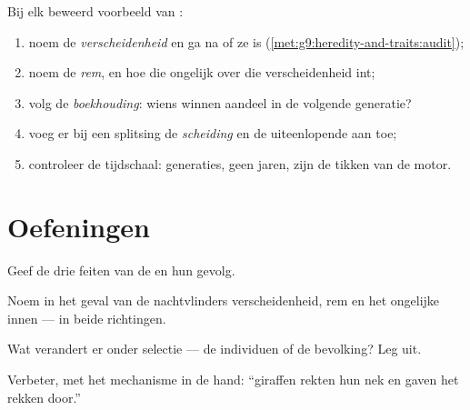 \begin{method}\label{met:g9:how-species-change:run}
Bij elk beweerd voorbeeld van :
\begin{enumerate}
  \item noem de \emph{verscheidenheid} en ga na of ze  is
        (\cref{met:g9:heredity-and-traits:audit});
  \item noem de \emph{rem}, en hoe die ongelijk over die
        verscheidenheid int;
  \item volg de \emph{boekhouding}: wiens  winnen aandeel
        in de volgende generatie?
  \item voeg er bij een splitsing de \emph{scheiding} en de
        uiteenlopende  aan toe;
  \item controleer de tijdschaal: generaties, geen jaren, zijn de
        tikken van de motor.
\end{enumerate}
\end{method}

\section{Oefeningen}

\begin{exercise}[$\star$]\label{exo:g9:how-species-change:1}
Geef de drie feiten van de  en hun
gevolg.
\end{exercise}

\begin{exercise}[$\star$]\label{exo:g9:how-species-change:2}
Noem in het geval van de nachtvlinders verscheidenheid, rem en het
ongelijke innen --- in beide richtingen.
\end{exercise}

\begin{exercise}[$\star$]\label{exo:g9:how-species-change:3}
Wat verandert er onder selectie --- de individuen of de bevolking?
Leg uit.
\end{exercise}

\begin{exercise}[$\star$]\label{exo:g9:how-species-change:4}
Verbeter, met het mechanisme in de hand: ``giraffen rekten hun nek
en gaven het rekken door.''
\end{exercise}

